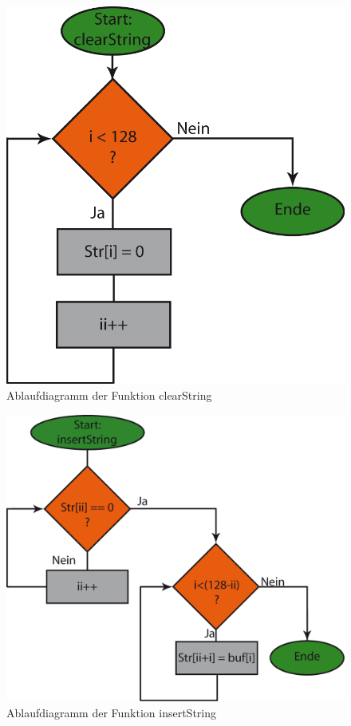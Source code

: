 \begin{figure}[h]
\includegraphics[scale = 0.8]{./Clear_String.png}
\hspace{-14pt}
\caption{Ablaufdiagramm der Funktion clearString}
\end{figure} 

\begin{figure}[h]
\includegraphics[scale = 0.8]{./Insert_String.png}
\hspace{-14pt}
\caption{Ablaufdiagramm der Funktion insertString}
\end{figure} 







